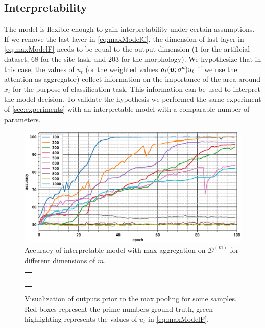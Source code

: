 \subsection{Interpretability}
\label{sec:interpretability}
The model is flexible enough to gain interpretability under certain
assumptions. If we remove the last layer in \eqref{eq:maxModelC},
the dimension of last layer in \eqref{eq:maxModelF}
needs to be equal to the
output dimension ($1$ for the artificial dataset, $68$ for the site
task, and $203$ for the 
morphology).
We hypothesize that in this case, the values of
$u_t$ (or the weighted values $a_t(\bm{u};\sigma^a)u_t$ if we use the
attention as aggregator) collect information on the importance of the
area 
around $x_t$ for the purpose of classification task. This
information can be
used to interpret the model decision. To validate the
hypothesis we performed the same experiment of \cref{sec:experiments}
with an interpretable model with a comparable number of parameters.

\begin{figure}
  \centering
  \includegraphics[width=\floatwidth]{imgMax/accuracy-int.eps}
  \caption{Accuracy of interpretable model with max aggregation on $\mathcal{D}^{(m)}$ for different dimensions of $m$.}
  \label{fig:testAccInt}
\end{figure}

\begin{figure}
  \centering
  \footnotesize
  \begin{tabular}{|p{\floatwidth}|}
    \hline
    \\
    \hline
    \\
    \hline
    \\
    \hline
    \\
    \hline
    \\
    \hline
    \\
    \hline
  \end{tabular}
  \caption{Visualization of outputs prior to the max pooling for some
    samples. Red boxes represent the prime numbers ground
    truth, green highlighting represents the values of $u_t$ in
    \eqref{eq:maxModelF}.}
  \label{fig:testAttention}
\end{figure}

